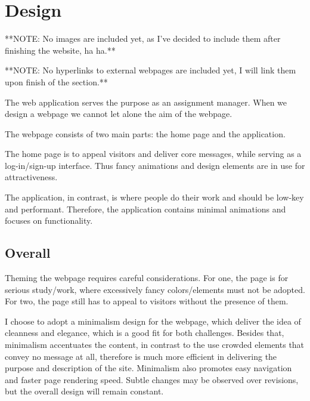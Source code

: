 \documentclass[12pt]{report}
\newcommand{\n}{\par}
\newcommand{\br}{\n\vspace{1 em}\n}
\begin{document}
\section{Design} \label{presentation-layer.design}
**NOTE: No images are included yet, as I've decided to include them after finishing the website, ha ha.**\n
**NOTE: No hyperlinks to external webpages are included yet, I will link them upon finish of the section.**
\br
The web application serves the purpose as an assignment manager.
When we design a webpage we cannot let alone the aim of the webpage.
\br
The webpage consists of two main parts: the home page and the application.\n
The home page is to appeal visitors and deliver core messages, while serving as a log-in/sign-up interface.
Thus fancy animations and design elements are in use for attractiveness.\n
The application, in contrast, is where people do their work and should be low-key and performant.
Therefore, the application contains minimal animations and focuses on functionality.


\subsection{Overall} \label{presentation-layer.design.overall}
Theming the webpage requires careful considerations.
For one, the page is for serious study/work, where excessively fancy colors/elements must not be adopted.
For two, the page still has to appeal to visitors without the presence of them.\n
I choose to adopt a minimalism design for the webpage,
which deliver the idea of cleanness and elegance, which is a good fit for both challenges.
Besides that, minimalism accentuates the content, in contrast to the use crowded elements that convey no message at all,
therefore is much more efficient in delivering the purpose and description of the site.
Minimalism also promotes easy navigation and faster page rendering speed.
Subtle changes may be observed over revisions, but the overall design will remain constant.
\end{document}

